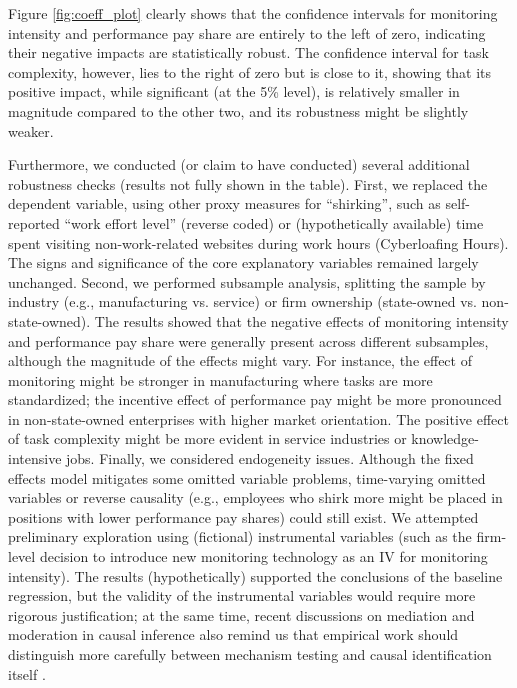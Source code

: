 Figure \ref{fig:coeff_plot} clearly shows that the confidence intervals for monitoring intensity and performance pay share are entirely to the left of zero, indicating their negative impacts are statistically robust. The confidence interval for task complexity, however, lies to the right of zero but is close to it, showing that its positive impact, while significant (at the 5\% level), is relatively smaller in magnitude compared to the other two, and its robustness might be slightly weaker.

Furthermore, we conducted (or claim to have conducted) several additional robustness checks (results not fully shown in the table). First, we {replaced the dependent variable}, using other proxy measures for \enquote{shirking}, such as self-reported \enquote{work effort level} (reverse coded) or (hypothetically available) time spent visiting non-work-related websites during work hours (Cyberloafing Hours). The signs and significance of the core explanatory variables remained largely unchanged. Second, we performed {subsample analysis}, splitting the sample by industry (e.g., manufacturing vs. service) or firm ownership (state-owned vs. non-state-owned). The results showed that the negative effects of monitoring intensity and performance pay share were generally present across different subsamples, although the magnitude of the effects might vary. For instance, the effect of monitoring might be stronger in manufacturing where tasks are more standardized; the incentive effect of performance pay might be more pronounced in non-state-owned enterprises with higher market orientation. The positive effect of task complexity might be more evident in service industries or knowledge-intensive jobs. Finally, we {considered endogeneity issues}. Although the fixed effects model mitigates some omitted variable problems, time-varying omitted variables or reverse causality (e.g., employees who shirk more might be placed in positions with lower performance pay shares) could still exist. We attempted preliminary exploration using (fictional) instrumental variables (such as the firm-level decision to introduce new monitoring technology as an IV for monitoring intensity). The results (hypothetically) supported the conclusions of the baseline regression, but the validity of the instrumental variables would require more rigorous justification; at the same time, recent discussions on mediation and moderation in causal inference also remind us that empirical work should distinguish more carefully between mechanism testing and causal identification itself \citep{jiang2022mediation}.

